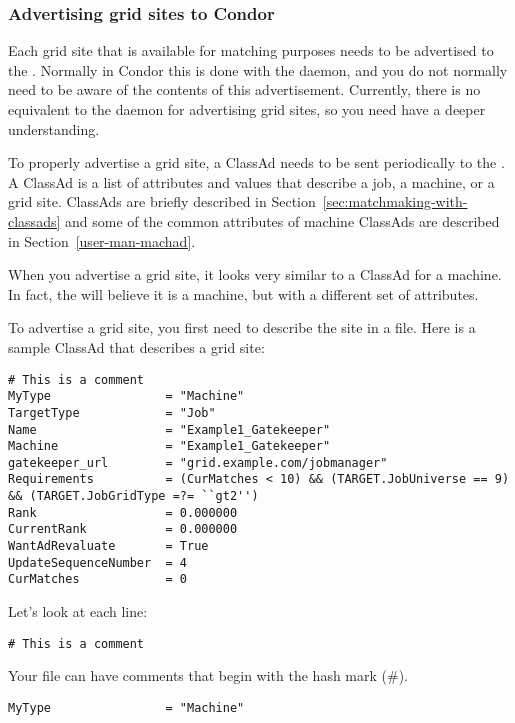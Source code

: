 \subsubsection{Advertising grid sites to Condor}

Each grid site that is available for matching purposes needs to be
advertised to the . Normally in Condor this is done
with the  daemon, and you do not normally need to be
aware of the contents of this advertisement. Currently, there is no
equivalent to the  daemon for advertising grid sites,
so you need have a deeper understanding.

To properly advertise a grid site, a ClassAd needs to be sent
periodically to the . A ClassAd is a list of
attributes and values that describe a job, a machine, or a grid
site. ClassAds are briefly described in
Section~\ref{sec:matchmaking-with-classads} and some of the common
attributes of machine ClassAds are described in
Section~\ref{user-man-machad}.

When you advertise a grid site, it looks very similar to a ClassAd for
a machine. In fact, the  will believe it is a
machine, but with a different set of attributes. 

To advertise a grid site, you first need to describe the site in a
file. Here is a sample ClassAd that describes a grid site:

\footnotesize
\begin{verbatim}
# This is a comment
MyType                = "Machine"
TargetType            = "Job"
Name                  = "Example1_Gatekeeper"
Machine               = "Example1_Gatekeeper"
gatekeeper_url        = "grid.example.com/jobmanager"
Requirements          = (CurMatches < 10) && (TARGET.JobUniverse == 9) && (TARGET.JobGridType =?= ``gt2'')
Rank                  = 0.000000
CurrentRank           = 0.000000
WantAdRevaluate       = True
UpdateSequenceNumber  = 4
CurMatches            = 0
\end{verbatim}
\normalsize

Let's look at each line:

\begin{verbatim}
# This is a comment
\end{verbatim}

Your file can have comments that begin with the hash mark (\#). 

\begin{verbatim}
MyType                = "Machine"
\end{verbatim}

